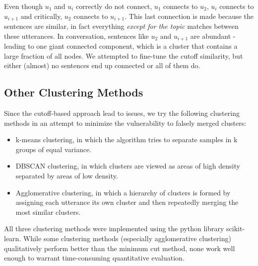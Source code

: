         Even though $u_1$ and $u_{i}$ correctly do not connect, $u_1$ connects to $u_2$, $u_{i}$ connects to $u_{i+1}$ and critically, $u_2$ connects to $u_{i+1}$. This last connection is made because the sentences are similar, in fact everything \textit{except for the topic} matches between these \glspl{utterance}. In conversation, sentences like $u_2$ and $u_{i+1}$ are abundant - leading to one giant connected component, which is a cluster that contains a large fraction of all nodes. We attempted to fine-tune the cutoff similarity, but either (almost) no sentences end up connected or all of them do.


    \subsection{Other Clustering Methods}
        Since the cutoff-based approach lead to issues, we try the following clustering methods in an attempt to minimize the vulnerability to falsely merged clusters:
        \begin{itemize}
            \item k-means clustering, in which the algorithm tries to separate samples in k groups of equal variance.
            \item DBSCAN clustering, in which clusters are viewed as areas of high density separated by areas of low density.
            \item Agglomerative clustering, in which a hierarchy of clusters is formed by assigning each \gls{utterance} its own cluster and then repeatedly merging the most similar clusters.
        \end{itemize}
        All three clustering methods were implemented using the python library scikit-learn\cite{scikit-learn}. While some clustering methods (especially agglomerative clustering) qualitatively perform better than the minimum cut method, none work well enough to warrant time-consuming quantitative evaluation.


